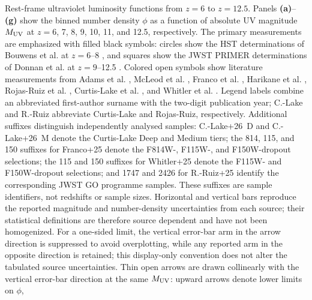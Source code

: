 \caption{\label{fig:uvlf-z6-12p5}
Rest-frame ultraviolet luminosity functions from $z=6$ to $z=12.5$.
Panels \textbf{(a)}--\textbf{(g)} show the binned number density
$\phi$ as a function of absolute UV magnitude $M_{\rm UV}$ at
$z=6$, 7, 8, 9, 10, 11, and 12.5, respectively.
The primary measurements are emphasized with filled black symbols:
circles show the HST determinations of Bouwens et al. at $z=6$--8
\citep{Bouwens2021UVLF}, and squares show the JWST PRIMER
determinations of Donnan et al. at $z=9$--12.5
\citep{Donnan2024PRIMER}.
Colored open symbols show literature measurements from
Adams et al. \citep{Adams2024EPOCHS}, McLeod et al. \citep{McLeod2024UVLF},
Franco et al.
\citep{Franco2025COSMOSWeb}, Harikane et al.
\citep{Harikane2025Spectroscopic}, Rojas-Ruiz et al.
\citep{RojasRuiz2025BoRG}, Curtis-Lake et al.
\citep{CurtisLake2026JADESDR4}, and Whitler et al.
\citep{Whitler2026JADES}.
Legend labels combine an abbreviated first-author surname with the
two-digit publication year; \mbox{C.-Lake} and
\mbox{R.-Ruiz} abbreviate Curtis-Lake and Rojas-Ruiz,
respectively. Additional suffixes distinguish independently analysed
samples: \mbox{C.-Lake+26 D} and \mbox{C.-Lake+26 M} denote the
Curtis-Lake Deep and Medium tiers; the 814, 115, and 150 suffixes for
Franco+25 denote the F814W-, F115W-, and F150W-dropout selections;
the 115 and 150 suffixes for Whitler+25 denote the F115W- and
F150W-dropout selections; and 1747 and 2426 for R.-Ruiz+25 identify
the corresponding JWST GO programme samples. These suffixes are
sample identifiers, not redshifts or sample sizes.
Horizontal and vertical bars reproduce the reported magnitude and
number-density uncertainties from each source; their statistical
definitions are therefore source dependent and have not been
homogenized. For a one-sided limit, the vertical error-bar arm in the
arrow direction is suppressed to avoid overplotting, while any
reported arm in the opposite direction is retained; this display-only
convention does not alter the tabulated source uncertainties. Thin
open arrows are drawn collinearly with the vertical error-bar direction
at the same $M_{\rm UV}$: upward arrows denote lower limits on $\phi$,
}
